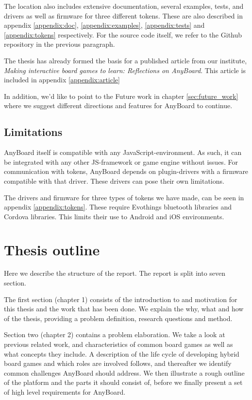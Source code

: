 The location also includes extensive documentation, several examples, tests, and drivers as well as firmware for three different tokens. These are also described in appendix \ref{appendix:doc}, \ref{appendix:examples}, \ref{appendix:tests} and \ref{appendix:tokens} respectively. For the source code itself, we refer to the Github repository in the previous paragraph.

The thesis has already formed the basis for a published article from our institute, \emph{Making interactive board games to learn: Reflections on AnyBoard}\cite{anyboard_article}. This article is included in appendix \ref{appendix:article}

In addition, we'd like to point to the Future work in chapter \ref{sec:future_work} where we suggest different directions and features for  AnyBoard to continue.

\subsection{Limitations}
AnyBoard itself is compatible with any JavaScript-environment. As such, it can be integrated with any other JS-framework or game engine without issues. For communication with tokens, AnyBoard depends on plugin-drivers with a firmware compatible with that driver. These drivers can pose their own limitations.

The drivers and firmware for three types of tokens we have made, can be seen in appendix \ref{appendix:tokens}. These require Evothings bluetooth libraries and Cordova libraries. This limits their use to Android and iOS environments. 

\section{Thesis outline} \label{sec:introoutline}
Here we describe the structure of the report. The report is split into seven section.

The first section (chapter 1) consists of the introduction to and motivation for this thesis and the work that has been done. We explain the why, what and how of the thesis, providing a problem definition, research questions and method.

Section two (chapter 2) contains a problem elaboration. We take a look at previous related work, and characteristics of common board games as well as what concepts they include. A description of the life cycle of developing hybrid board games and which roles are involved follows, and thereafter we identify common challenges AnyBoard should address. We then illustrate a rough outline of the platform and the parts it should consist of, before we finally present a set of high level requirements for AnyBoard.


